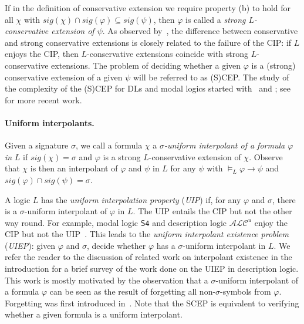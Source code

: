 \documentclass[10pt,a4paper]{amsart}
\theoremstyle{plain}
\theoremstyle{definition}
\newcommand{\nb}[1]{\textcolor{red}{\bf!}%
	\marginpar[\parbox{15mm}{\raggedleft\scriptsize\textcolor{red}{#1}}]%
	{\parbox{15mm}{\raggedright\scriptsize\textcolor{red}{#1}}}}
\newcommand{\sig}{\mathit{sig}}
\begin{document}
If in the definition of conservative extension we require property (b) to hold for all $\chi$ with $\sig(\chi) \cap \sig(\varphi) \subseteq \sig(\psi)$, then $\varphi$ is called a \emph{strong $L$-conservative extension of $\psi$}. As observed by~\cite{DBLP:conf/icalp/JungLM0W17}, the difference between conservative and strong conservative extensions is closely related to the failure of the CIP: if $L$ enjoys the CIP, then $L$-conservative extensions coincide with strong  $L$-conservative extensions. The problem of deciding whether a given $\varphi$ is a (strong) conservative extension of a given $\psi$ will be referred to as (S)CEP. The study of the complexity of the (S)CEP for DLs and modal logics started with~\cite{DBLP:conf/kr/GhilardiLW06} and \cite{DBLP:conf/aiml/GhilardiLWZ06}; see~\cite{DBLP:journals/ai/BotoevaLRWZ19,DBLP:conf/kr/JungLM22} for more recent work.


\paragraph{Uniform interpolants.} Given a signature $\sigma$, we call a formula $\chi$ a \emph{$\sigma$-uniform interpolant of a formula $\varphi$ in} $L$ if $\sig(\chi)=\sigma$ and $\varphi$ is a strong $L$-conservative extension of $\chi$. Observe that $\chi$ is then an interpolant of $\varphi$ and $\psi$ in $L$ for any $\psi$ with $\models_{L}\varphi \rightarrow \psi$ and $\sig(\varphi) \cap \sig(\psi) = \sigma$. 
	
A logic $L$ has the \emph{uniform interpolation property} (\emph{UIP}) if, for any $\varphi$ and $\sigma$, there is a $\sigma$-uniform interpolant of $\varphi$ in $L$. The UIP entails the CIP  but not the other way round. For example, modal logic $\mathsf{S4}$ and description logic $\mathcal{ALC}^{u}$ enjoy the CIP but not the UIP~\cite{DBLP:journals/sLogica/GhilardiZ95,DBLP:conf/ijcai/LutzW11}.
This leads to the \emph{uniform interpolant existence problem} (\emph{UIEP}):  given $\varphi$ and $\sigma$, decide whether $\varphi$ has a $\sigma$-uniform interpolant in $L$. We refer the reader to the discussion of related work on interpolant existence in the introduction for a brief survey of the work done on the UIEP in description logic. This work is mostly motivated by the observation that a $\sigma$-uniform interpolant of a formula $\varphi$ can be seen as the result of forgetting all non-$\sigma$-symbols from $\varphi$. Forgetting was first introduced in~\cite{Lin94a}. 
%
Note that the SCEP is equivalent to verifying whether a given formula is a uniform interpolant.
\end{document}
